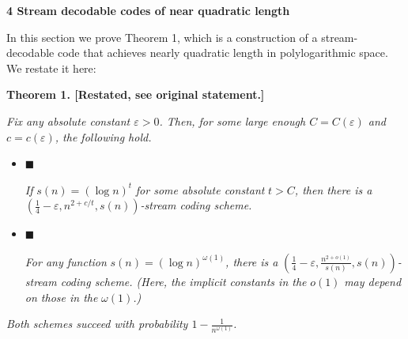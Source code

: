 \par\medskip\noindent\textbf{
4 Stream decodable codes of near quadratic length}\par




In this section we prove Theorem 1, which is a construction of a stream-decodable code that achieves nearly quadratic length in polylogarithmic space. We restate it here:\par






\par\medskip\noindent\textbf{
\textbf{Theorem 1}\textbf{.}
[Restated, see original statement.]}\par



\emph{Fix any absolute constant $\varepsilon>0$. Then, for some large enough
$C=C(\varepsilon)$ and $c=c(\varepsilon)$, the following hold.}\par


\begin{itemize}


\item[] 
$\blacksquare$ 


\emph{If }$s(n)=(\log n)^{t}$\emph{ for some absolute constant }$t>C$\emph{, then there is a }$\left(\frac{1}{4}-\varepsilon,n^{2+c/t},s(n)\right)$\emph{-stream coding scheme.}\par





\item[] 
$\blacksquare$ 


\emph{For any function }$s(n)=(\log n)^{\omega(1)}$\emph{, there is a }$\left(\frac{1}{4}-\varepsilon,\frac{n^{2+o(1)}}{s(n)},s(n)\right)$\emph{-stream coding scheme. (Here, the implicit constants in the }$o(1)$\emph{ may depend on those in the }$\omega(1)$\emph{.)}\par





\end{itemize}


\emph{Both schemes succeed with probability $1-\frac{1}{n^{\omega(1)}}$.}\par







